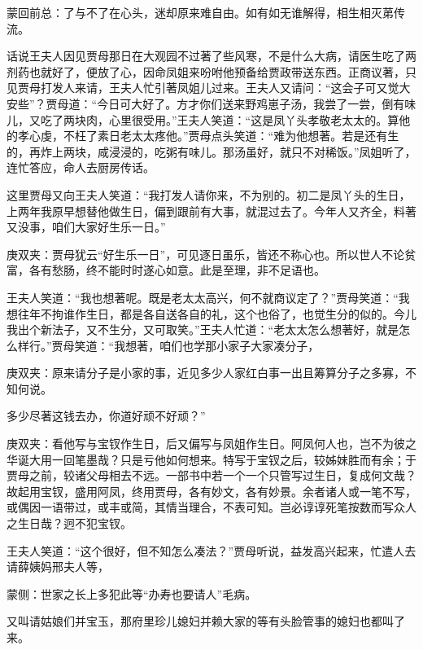 

\begin{parag}
    \begin{note}蒙回前总：了与不了在心头，迷却原来难自由。如有如无谁解得，相生相灭苐传流。\end{note}
\end{parag}


\begin{parag}
    话说王夫人因见贾母那日在大观园不过著了些风寒，不是什么大病，请医生吃了两剂药也就好了，便放了心，因命凤姐来吩咐他预备给贾政带送东西。正商议著，只见贾母打发人来请，王夫人忙引著凤姐儿过来。王夫人又请问：“这会子可又觉大安些”？贾母道：“今日可大好了。方才你们送来野鸡崽子汤，我尝了一尝，倒有味儿，又吃了两块肉，心里很受用。”王夫人笑道：“这是凤丫头孝敬老太太的。算他的孝心虔，不枉了素日老太太疼他。”贾母点头笑道：“难为他想著。若是还有生的，再炸上两块，咸浸浸的，吃粥有味儿。那汤虽好，就只不对稀饭。”凤姐听了，连忙答应，命人去厨房传话。
\end{parag}


\begin{parag}
    这里贾母又向王夫人笑道：“我打发人请你来，不为别的。初二是凤丫头的生日，上两年我原早想替他做生日，偏到跟前有大事，就混过去了。今年人又齐全，料著又没事，咱们大家好生乐一日。”\begin{note}庚双夹：贾母犹云“好生乐一日”，可见逐日虽乐，皆还不称心也。所以世人不论贫富，各有愁肠，终不能时时遂心如意。此是至理，非不足语也。\end{note}王夫人笑道：“我也想著呢。既是老太太高兴，何不就商议定了？”贾母笑道：“我想往年不拘谁作生日，都是各自送各自的礼，这个也俗了，也觉生分的似的。今儿我出个新法子，又不生分，又可取笑。”王夫人忙道：“老太太怎么想著好，就是怎么样行。”贾母笑道：“我想著，咱们也学那小家子大家凑分子，\begin{note}庚双夹：原来请分子是小家的事，近见多少人家红白事一出且筹算分子之多寡，不知何说。\end{note}多少尽著这钱去办，你道好顽不好顽？”\begin{note}庚双夹：看他写与宝钗作生日，后又偏写与凤姐作生日。阿凤何人也，岂不为彼之华诞大用一回笔墨哉？只是亏他如何想来。特写于宝钗之后，较姊妹胜而有余；于贾母之前，较诸父母相去不远。一部书中若一个一个只管写过生日，复成何文哉？故起用宝钗，盛用阿凤，终用贾母，各有妙文，各有妙景。余者诸人或一笔不写，或偶因一语带过，或丰或简，其情当理合，不表可知。岂必谆谆死笔按数而写众人之生日哉？迥不犯宝钗。\end{note}王夫人笑道：“这个很好，但不知怎么凑法？”贾母听说，益发高兴起来，忙遣人去请薛姨妈邢夫人等，\begin{note}蒙侧：世家之长上多犯此等“办寿也要请人”毛病。\end{note}又叫请姑娘们并宝玉，那府里珍儿媳妇并赖大家的等有头脸管事的媳妇也都叫了来。
\end{parag}


